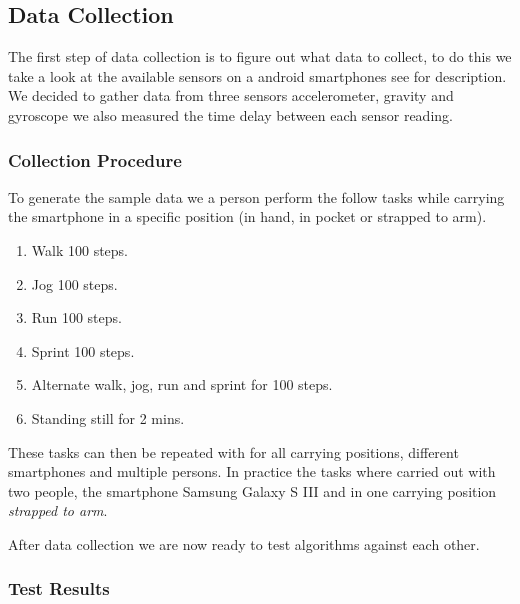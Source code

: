 \subsection{Data Collection}
The first step of data collection is to figure out what data to collect, to do this we take a look at the available sensors on a android smartphones see  for description. We decided to gather data from three sensors accelerometer, gravity and gyroscope we also measured the time delay between each sensor reading.


\subsubsection{Collection Procedure}
To generate the sample data we a person perform the follow tasks while carrying the smartphone in a specific position (in hand, in pocket or strapped to arm).
\begin{enumerate}
\item Walk 100 steps.
\item Jog 100 steps.
\item Run 100 steps.
\item Sprint 100 steps.
\item Alternate walk, jog, run and sprint for 100 steps.
\item Standing still for 2 mins.
\end{enumerate}

These tasks can then be repeated with for all carrying positions, different smartphones and multiple persons. In practice the tasks where carried out with two people, the smartphone Samsung Galaxy S III and in one carrying position \textit{strapped to arm}.

After data collection we are now ready to test algorithms against each other.


\subsubsection{Test Results}



